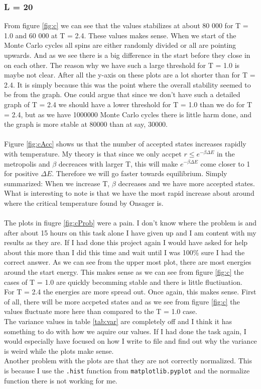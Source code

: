 \documentclass{article}
\begin{document}
\subsubsection*{L = 20}
From figure \ref{fig:c} we can see that the values stabilizes at about 80 000 for T = 1.0 and 60 000 at T = 2.4. These values makes sense. When we start of the Monte Carlo cycles all spins are either randomly divided or all are pointing upwards. And as we see there is a big difference in the start before they close in on each other.  The reason why we have such a large threshold for T = 1.0 is maybe not clear. After all the y-axis on these plots are a lot shorter than for T = 2.4. It is simply because this was the point where the overall stability seemed to be from the graph. One could argue that since we don't have such a detailed graph of T = 2.4 we should have a lower threshold for T = 1.0 than we do for T = 2.4, but as we have 1000000 Monte Carlo cycles there is little harm done, and the graph is more stable at 80000 than at say, 30000.
\\ \\
Figure \ref{fig:cAcc} shows us that the number of accepted states increases rapidly with temperature. My theory is that since we only accpet $r \leq e^{-\beta \Delta E}$ in the metropolis and $\beta$ decreaces with larger T, this will make $e^{-\beta \Delta E}$ come closer to 1 for positive $\Delta E$. Therefore we will go faster towards equilibrium. Simply summarized: When we increase T, $\beta$ decreases and we have more accepted states. What is interesting to note is that we have the most rapid increase about around where the critical temperature found by Onsager is. \\ \\
The plots in fiugre \ref{fig:cProb} were a pain. I don't know where the problem is and after about 15 hours on this task alone I have given up and I am content with my results as they are. If I had done this project again I would have asked for help about this more than I did this time and wait until I was 100\% sure I had the correct answer. As we can see from the upper most plot, there are most energies around the start energy. This makes sense as we can see from figure \ref{fig:c} the cases of T = 1.0 are quickly becomming stable and there is little fluctiuation. \\
For T = 2.4 the energies are more spread out. Once again, this makes sense. First of all, there will be more accpeted states and as we see from figure \ref{fig:c} the values fluctuate more here than compared to the T = 1.0 case. \\
The variance values in table \ref{tab:var} are completely off and I think it has something to do with how we aquire our values. If I had done the task again, I would especially have focused on how I write to file and find out why the variance is weird while the plots make sense. \\
Another problem with the plots are that they are not correctly normalized. This is because I use the \texttt{.hist} function from \texttt{matplotlib.pyplot} and the normalize function there is not working for me.
\end{document}
